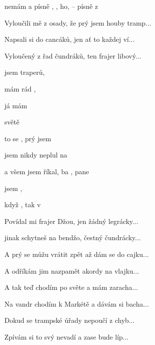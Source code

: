 

\zs
{} nemám  a  písně ,
, ho,  --  písně z  

Vyloučili mě z osady, že prý jsem houby tramp...

Napsali si do cancáků, jen ať to každej ví...

Vyloučený z řad čundráků, ten frajer libový...
\ks

\zr
{} jsem  traperů, 

 mám rád ,

já mám  

  světě 

to  se ,  prý jsem 

 jsem nikdy neplul na 

a všem  jsem říkal, ba , pane

 jsem  ,

 když , tak v    
\kr

\zs
Povídal mi frajer Džou, jen žádný legrácky...

jinak schytneš na bendžo, čestný čundrácky...

A prý se můžu vrátit zpět až dám se do cajku...

A odříkám jim nazpamět akordy na vlajku...
\ks

\zr \kr

\zs
A tak teď chodím po světe a mám zaracha...

Na vandr chodím k Markétě a dávám si bacha...

Dokud se trampské úřady nepoučí z chyb...

Zpívám si to svý nevadí a zase bude líp...
\ks

\zr \kr

\kp






